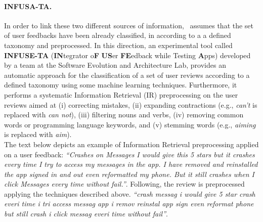 \paragraph{INFUSA-TA.}
In order to link these two different sources of information, \toolname\ assumes that the set of user feedbacks have been already classified, in according to a a defined taxonomy and preprocessed.
In this direction, an experimental tool called  \textbf{INFUSE-TA} (\textbf{IN}tegrator o\textbf{F} \textbf{US}er \textbf{FE}edback while Testing \textbf{A}pps) developed by a team at the Software Evolution and Architecture Lab, provides an automatic approach for the classification of a set of user reviews according to a defined taxonomy using some machine learning techniques. 
Furthermore, it performs a systematic Information Retrieval (IR) preprocessing \cite{BaezaYates:1999} on the user reviews aimed at (i) correcting mistakes, (ii) expanding contractions (e.g., \textit{can’t} is replaced with \textit{can not}), (iii) filtering nouns and verbs, (iv) removing common words or programming language keywords, and (v) stemming words (e.g., \textit{aiming} is replaced with \textit{aim}). \\
The text below depicts an example of Information Retrieval preprocessing applied on a user feedback: 
\smallbreak
\emph{\small``Crashes on Messages I would give this 5 stars but it crashes every time I try to access my messages in the app. I have removed and reinstalled the app  signed in and out  even reformatted my phone. But it still crashes when I click Messages  every time without fail.''}. 
\smallbreak
Following, the review is preprocessed applying the techniques described above.  \smallbreak
\emph{\small``crash messag i would give 5 star crash everi time i tri access messag app i remov reinstal app  sign  even reformat phone but still crash i click messag  everi time without fail''}. 
\smallbreak

